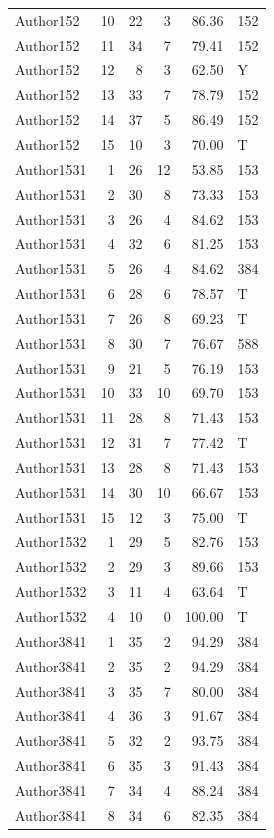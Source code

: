 \begin{longtable}{lrrrrl}
Author152 & 10 & 22 & 3 & 86.36 & 152\\
Author152 & 11 & 34 & 7 & 79.41 & 152\\
Author152 & 12 & 8 & 3 & 62.50 & Y\\
Author152 & 13 & 33 & 7 & 78.79 & 152\\
Author152 & 14 & 37 & 5 & 86.49 & 152\\
Author152 & 15 & 10 & 3 & 70.00 & T\\
Author1531 & 1 & 26 & 12 & 53.85 & 153\\
Author1531 & 2 & 30 & 8 & 73.33 & 153\\
Author1531 & 3 & 26 & 4 & 84.62 & 153\\
Author1531 & 4 & 32 & 6 & 81.25 & 153\\
Author1531 & 5 & 26 & 4 & 84.62 & 384\\
Author1531 & 6 & 28 & 6 & 78.57 & T\\
Author1531 & 7 & 26 & 8 & 69.23 & T\\
Author1531 & 8 & 30 & 7 & 76.67 & 588\\
Author1531 & 9 & 21 & 5 & 76.19 & 153\\
Author1531 & 10 & 33 & 10 & 69.70 & 153\\
Author1531 & 11 & 28 & 8 & 71.43 & 153\\
Author1531 & 12 & 31 & 7 & 77.42 & T\\
Author1531 & 13 & 28 & 8 & 71.43 & 153\\
Author1531 & 14 & 30 & 10 & 66.67 & 153\\
Author1531 & 15 & 12 & 3 & 75.00 & T\\
Author1532 & 1 & 29 & 5 & 82.76 & 153\\
Author1532 & 2 & 29 & 3 & 89.66 & 153\\
Author1532 & 3 & 11 & 4 & 63.64 & T\\
Author1532 & 4 & 10 & 0 & 100.00 & T\\
Author3841 & 1 & 35 & 2 & 94.29 & 384\\
Author3841 & 2 & 35 & 2 & 94.29 & 384\\
Author3841 & 3 & 35 & 7 & 80.00 & 384\\
Author3841 & 4 & 36 & 3 & 91.67 & 384\\
Author3841 & 5 & 32 & 2 & 93.75 & 384\\
Author3841 & 6 & 35 & 3 & 91.43 & 384\\
Author3841 & 7 & 34 & 4 & 88.24 & 384\\
Author3841 & 8 & 34 & 6 & 82.35 & 384\\

\end{longtable}
